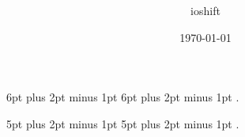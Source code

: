 \usepackage{amsmath}
\usepackage{amssymb}
\usepackage{amsthm}
\usepackage{bm}

\usepackage{geometry}
\geometry{
    a4paper,
    margin=1in,
    headheight=15pt
}
\usepackage{fancyhdr}
\pagestyle{fancy}
\fancyhf{}
\fancyfoot[C]{\thepage}
\lhead{\emph{\nouppercase{\leftmark}}}

\usepackage{enumitem}
\usepackage{etoolbox}
\usepackage{caption}
\usepackage{pgffor}
\usepackage{xcolor}
\usepackage{tikz}
\usetikzlibrary{arrows.meta, positioning}

\renewcommand{\theenumi}{\alph{enumi}}
\renewcommand{\labelenumi}{(\theenumi)}

\setlength{\parindent}{0pt}
\setlength{\parskip}{5pt plus 2pt minus 1pt}

\author{ioshift}
\date{\today}
\title{\Huge\bfseries\ntitle}




  {6pt plus 2pt minus 1pt}  %
  {6pt plus 2pt minus 1pt}  %
  {\normalfont}             %
  {}                        %
  {\bfseries}               %
  {.}                       %
  { }                       %
  {}                        %

  {5pt plus 2pt minus 1pt}  %
  {5pt plus 2pt minus 1pt}  %
  {\normalfont}             %
  {}                        %
  {\bfseries}               %
  {.}                       %
  { }                       %
  {}                        %

\theoremstyle{notestyle_thm}
\newtheorem{thm}{Theorem}[subsection]
\renewcommand{\thethm}{%
  \ifnum\value{subsection}=0
    \thesection.\arabic{thm}%
  \else
    \thesubsection.\arabic{thm}%
  \fi
}

